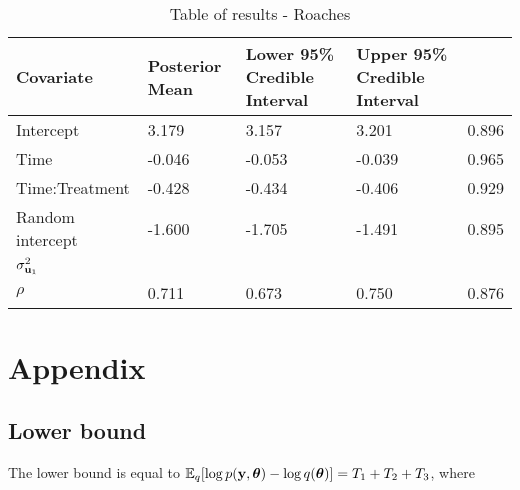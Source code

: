 \documentclass{article}[12pt]
\begin{document}
\begin{table}
\caption{Table of results - Roaches}
\label{tab:application_roaches}
\begin{tabular}{l|llll}
\hline
Covariate & Posterior Mean & Lower 95\% Credible Interval &  Upper 95\% Credible Interval \\
\hline
Intercept & 3.179 & 3.157 & 3.201 & 0.896 \\
Time & -0.046 & -0.053 & -0.039 & 0.965 \\
Time:Treatment & -0.428 & -0.434 & -0.406 & 0.929 \\
Random intercept & -1.600 & -1.705 & -1.491 & 0.895 \\
$\sigma^2_{{\bf u}_1}$ & & & & \\
$\rho$ & 0.711 & 0.673 & 0.750 & 0.876 \\
\hline
\end{tabular}
\end{table}




\section{Appendix} 
\subsection{Lower bound}
\noindent The lower bound is equal to
${\mathbb E}_q[\log{p({\bf y}, {\boldsymbol\theta})} - \log{q({\boldsymbol\theta})}] = T_1 + T_2 + T_3$,
where
\end{document}
